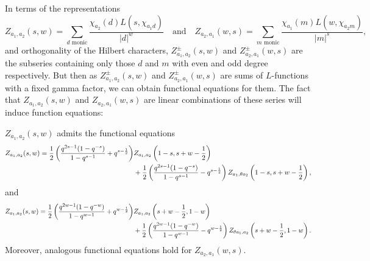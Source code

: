 \documentclass[12pt,reqno,oneside]{amsart}
\begin{document}
    In terms of the representations
    \[
        Z_{a_{1},a_{2}}(s,w) = \sum_{\text{$d$ monic}}\frac{\chi_{a_{2}}(d)L(s,\chi_{a_{1}d})}{|d|^{w}} \quad \text{and} \quad Z_{a_{2},a_{1}}(w,s) = \sum_{\text{$m$ monic}}\frac{\chi_{a_{1}}(m)L(w,\chi_{a_{2}m})}{|m|^{s}},
    \]
    and orthogonality of the Hilbert characters, $Z_{a_{1},a_{2}}^{\pm}(s,w)$ and $Z_{a_{2},a_{1}}^{\pm}(w,s)$ are the subseries containing only those $d$ and $m$ with even and odd degree respectively. But then as $Z_{a_{1},a_{2}}^{\pm}(s,w)$ and $Z_{a_{2},a_{1}}^{\pm}(w,s)$ are sums of $L$-functions with a fixed gamma factor, we can obtain functional equations for them. The fact that $Z_{a_{1},a_{2}}(s,w)$ and $Z_{a_{2},a_{1}}(w,s)$ are linear combinations of these series will induce function equations:

    \begin{theorem}\label{thm:double_Dirichlet_series_functional_equation}
        $Z_{a_{1},a_{2}}(s,w)$ admits the functional equations
        \begin{align*}
            Z_{a_{1},a_{2}}(s,w) = \frac{1}{2}\left(\frac{q^{2s-1}(1-q^{-s})}{1-q^{s-1}}+q^{s-\frac{1}{2}}\right)&Z_{a_{1},a_{2}}\left(1-s,s+w-\frac{1}{2}\right) \\
            &+\frac{1}{2}\left(\frac{q^{2s-1}(1-q^{-s})}{1-q^{s-1}}-q^{s-\frac{1}{2}}\right)Z_{a_{1},\theta a_{2}}\left(1-s,s+w-\frac{1}{2}\right),
        \end{align*}
        and
        \begin{align*}
            Z_{a_{1},a_{2}}(s,w) = \frac{1}{2}\left(\frac{q^{2w-1}(1-q^{-w})}{1-q^{w-1}}+q^{w-\frac{1}{2}}\right)&Z_{a_{1},a_{2}}\left(s+w-\frac{1}{2},1-w\right) \\
            &+\frac{1}{2}\left(\frac{q^{2w-1}(1-q^{-w})}{1-q^{w-1}}-q^{w-\frac{1}{2}}\right)Z_{\theta a_{1},a_{2}}\left(s+w-\frac{1}{2},1-w\right).
        \end{align*}
        Moreover, analogous functional equations hold for $Z_{a_{2},a_{1}}(w,s)$.
    \end{theorem}
\end{document}
